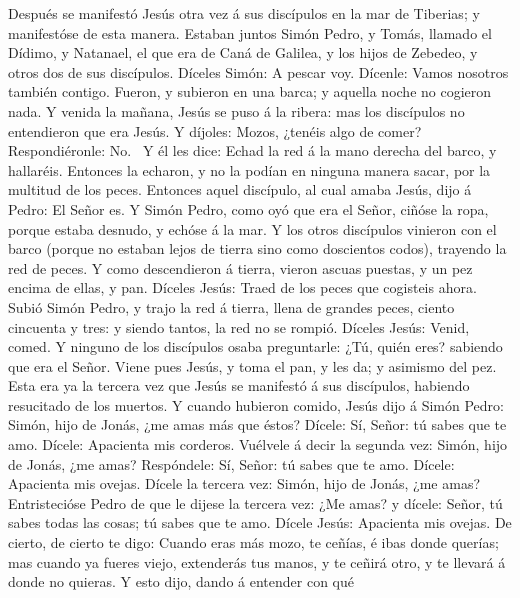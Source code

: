  Después se manifestó Jesús otra vez á sus discípulos en
la mar de Tiberias; y manifestóse de esta manera.  Estaban
juntos Simón Pedro, y Tomás, llamado el Dídimo, y Natanael, el que era
de Caná de Galilea, y los hijos de Zebedeo, y otros dos de sus
discípulos.  Díceles Simón: A pescar voy. Dícenle: Vamos
nosotros también contigo. Fueron, y subieron en una barca; y aquella
noche no cogieron nada.  Y venida la mañana, Jesús se puso
á la ribera: mas los discípulos no entendieron que era Jesús.
 Y díjoles: Mozos, ¿tenéis algo de comer? Respondiéronle:
No.~ Y él les dice: Echad la red á la mano derecha del
barco, y hallaréis. Entonces la echaron, y no la podían en ninguna
manera sacar, por la multitud de los peces.  Entonces
aquel discípulo, al cual amaba Jesús, dijo á Pedro: El Señor es. Y Simón
Pedro, como oyó que era el Señor, ciñóse la ropa, porque estaba desnudo,
y echóse á la mar.  Y los otros discípulos vinieron con el
barco (porque no estaban lejos de tierra sino como doscientos codos),
trayendo la red de peces.  Y como descendieron á tierra,
vieron ascuas puestas, y un pez encima de ellas, y pan. 
Díceles Jesús: Traed de los peces que cogisteis ahora. 
Subió Simón Pedro, y trajo la red á tierra, llena de grandes peces,
ciento cincuenta y tres: y siendo tantos, la red no se rompió.
 Díceles Jesús: Venid, comed. Y ninguno de los discípulos
osaba preguntarle: ¿Tú, quién eres? sabiendo que era el Señor.
 Viene pues Jesús, y toma el pan, y les da; y asimismo
del pez.  Esta era ya la tercera vez que Jesús se
manifestó á sus discípulos, habiendo resucitado de los muertos.
 Y cuando hubieron comido, Jesús dijo á Simón Pedro:
Simón, hijo de Jonás, ¿me amas más que éstos? Dícele: Sí, Señor: tú
sabes que te amo. Dícele: Apacienta mis corderos. 
Vuélvele á decir la segunda vez: Simón, hijo de Jonás, ¿me amas?
Respóndele: Sí, Señor: tú sabes que te amo. Dícele: Apacienta mis
ovejas.  Dícele la tercera vez: Simón, hijo de Jonás, ¿me
amas? Entristecióse Pedro de que le dijese la tercera vez: ¿Me amas? y
dícele: Señor, tú sabes todas las cosas; tú sabes que te amo. Dícele
Jesús: Apacienta mis ovejas.  De cierto, de cierto te
digo: Cuando eras más mozo, te ceñías, é ibas donde querías; mas cuando
ya fueres viejo, extenderás tus manos, y te ceñirá otro, y te llevará á
donde no quieras.  Y esto dijo, dando á entender con qué
